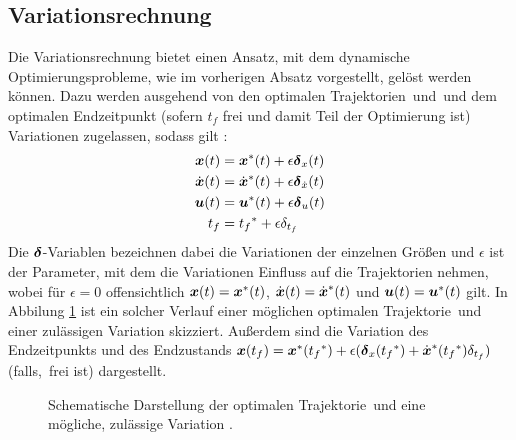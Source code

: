 \subsection{Variationsrechnung}\label{subsec:Variationsrechnung}
Die Variationsrechnung bietet einen Ansatz, mit dem dynamische Optimierungsprobleme, wie im vorherigen Absatz vorgestellt, gelöst werden können. Dazu werden ausgehend von den optimalen Trajektorien \xoptoft\,und \uoptoft\,und dem optimalen Endzeitpunkt  (sofern $t_f$ frei und damit Teil der Optimierung ist) Variationen zugelassen, sodass gilt \cite{KnutGraichen.2012}:
\begin{align}
\boldsymbol{x}(t) &= {\boldsymbol{x}}^*(t) + \epsilon\boldsymbol{\delta}_{x}(t) \label{eq:x_var}\\
\dot{\boldsymbol{x}}(t) &= \dot{\boldsymbol{x}}^*(t) + \epsilon\boldsymbol{\delta}_{\dot{x}}(t) \label{eq:dx_var}\\
\boldsymbol{u}(t) &= {\boldsymbol{u}}^*(t) + \epsilon\boldsymbol{\delta}_{u}(t) \label{eq:u_var}\\
t_f &= {t_f}^* + \epsilon\delta_{t_f}\label{eq:t_var}
\end{align}
Die $\boldsymbol{\delta}$-Variablen bezeichnen dabei die Variationen der einzelnen Größen und $\epsilon$ ist der Parameter, mit dem die Variationen Einfluss auf die Trajektorien nehmen, wobei für $\epsilon=0$ offensichtlich $\boldsymbol{x}(t)={\boldsymbol{x}}^*(t)$, $\dot{\boldsymbol{x}}(t) = \dot{\boldsymbol{x}}^*(t)$ und $\boldsymbol{u}(t)={\boldsymbol{u}}^*(t)$ gilt. In Abbilung \ref{fig:Variation} ist ein solcher Verlauf einer möglichen optimalen Trajektorie \xoptoft\,und einer zulässigen Variation skizziert. Außerdem sind die Variation des Endzeitpunkts und des Endzustands $\boldsymbol{x}(t_f) = {\boldsymbol{x}}^*({t_f}^*)+\epsilon(\boldsymbol{\delta}_{x}({t_f}^*)+\dot{\boldsymbol{x}}^*({t_f}^*)\delta_{t_f})$ (falls, \xoftf\,frei ist) dargestellt.
\begin{figure}[h]
\centering
{}
\caption{Schematische Darstellung der optimalen Trajektorie \xoptoft\,und eine mögliche, zulässige Variation \xoft.}
\label{fig:Variation}
\end{figure}

